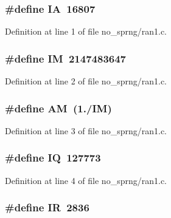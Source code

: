 \subsubsection[{I\-A}]{\setlength{\rightskip}{0pt plus 5cm}\#define I\-A~16807}\label{no__sprng_2ran1_8c_ae4b0efde4fa4613b407716d265d19b0a}


Definition at line 1 of file no\-\_\-sprng/ran1.\-c.

\subsubsection[{I\-M}]{\setlength{\rightskip}{0pt plus 5cm}\#define I\-M~2147483647}\label{no__sprng_2ran1_8c_a51c0dfe766601d31e907fceae818a7ca}


Definition at line 2 of file no\-\_\-sprng/ran1.\-c.

\subsubsection[{A\-M}]{\setlength{\rightskip}{0pt plus 5cm}\#define A\-M~(1./{\bf I\-M})}\label{no__sprng_2ran1_8c_ad301e6a88b1c01108f4867f2ea6f683c}


Definition at line 3 of file no\-\_\-sprng/ran1.\-c.

\subsubsection[{I\-Q}]{\setlength{\rightskip}{0pt plus 5cm}\#define I\-Q~127773}\label{no__sprng_2ran1_8c_ab7c5f3342853af6bb48d0ca00b05efbe}


Definition at line 4 of file no\-\_\-sprng/ran1.\-c.

\subsubsection[{I\-R}]{\setlength{\rightskip}{0pt plus 5cm}\#define I\-R~2836}\label{no__sprng_2ran1_8c_a68e22635ff207d8ca10459833856bd75}


